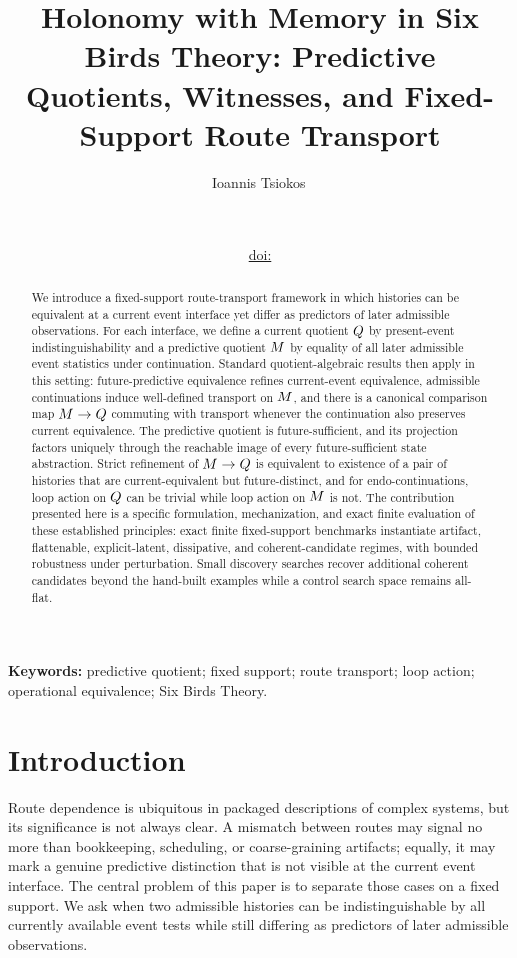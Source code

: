 \documentclass[11pt]{article}
\title{Holonomy with Memory in Six Birds Theory: Predictive Quotients, Witnesses, and Fixed-Support Route Transport}
\author{Ioannis Tsiokos\,\orcidlink{0009-0009-7659-5964}}
\date{\manuscriptdate\\\small\manuscriptversion%
  \ifpaperhasdoi\\\small\href{https://doi.org/\paperdoi}{doi:\paperdoi}\fi}
\theoremstyle{definition}
\begin{document}
\maketitle
\thispagestyle{firstpage}

\begin{abstract}
We introduce a fixed-support route-transport framework in which histories can be equivalent at a current event interface yet differ as predictors of later admissible observations. For each interface, we define a current quotient $Q$ by present-event indistinguishability and a predictive quotient $M$ by equality of all later admissible event statistics under continuation. Standard quotient-algebraic results then apply in this setting: future-predictive equivalence refines current-event equivalence, admissible continuations induce well-defined transport on $M$, and there is a canonical comparison map $M \to Q$ commuting with transport whenever the continuation also preserves current equivalence. The predictive quotient is future-sufficient, and its projection factors uniquely through the reachable image of every future-sufficient state abstraction. Strict refinement of $M \to Q$ is equivalent to existence of a pair of histories that are current-equivalent but future-distinct, and for endo-continuations, loop action on $Q$ can be trivial while loop action on $M$ is not. The contribution presented here is a specific formulation, mechanization, and exact finite evaluation of these established principles: exact finite fixed-support benchmarks instantiate artifact, flattenable, explicit-latent, dissipative, and coherent-candidate regimes, with bounded robustness under perturbation. Small discovery searches recover additional coherent candidates beyond the hand-built examples while a control search space remains all-flat.
\end{abstract}

\medskip
\noindent\textbf{Keywords:} predictive quotient; fixed support; route transport; loop action; operational equivalence; Six Birds Theory.

\section{Introduction}\label{sec:introduction}
Route dependence is ubiquitous in packaged descriptions of complex systems, but its significance is not always clear. A mismatch between routes may signal no more than bookkeeping, scheduling, or coarse-graining artifacts; equally, it may mark a genuine predictive distinction that is not visible at the current event interface. The central problem of this paper is to separate those cases on a fixed support. We ask when two admissible histories can be indistinguishable by all currently available event tests while still differing as predictors of later admissible observations.
\end{document}

